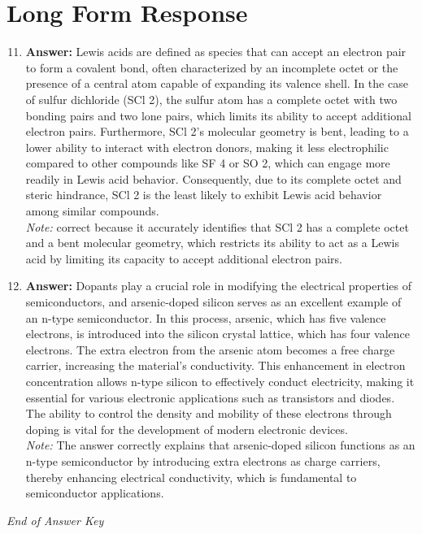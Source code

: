 \documentclass[12pt]{article}
\begin{document}
\section*{Long Form Response}
\begin{enumerate}[label=\arabic*.]
\setcounter{enumi}{10}
\item \textbf{Answer:} Lewis acids are defined as species that can accept an electron pair to form a covalent bond, often characterized by an incomplete octet or the presence of a central atom capable of expanding its valence shell. In the case of sulfur dichloride (SCl 2), the sulfur atom has a complete octet with two bonding pairs and two lone pairs, which limits its ability to accept additional electron pairs. Furthermore, SCl 2's molecular geometry is bent, leading to a lower ability to interact with electron donors, making it less electrophilic compared to other compounds like SF 4 or SO 2, which can engage more readily in Lewis acid behavior. Consequently, due to its complete octet and steric hindrance, SCl 2 is the least likely to exhibit Lewis acid behavior among similar compounds.
\\ \textit{Note:} correct because it accurately identifies that SCl 2 has a complete octet and a bent molecular geometry, which restricts its ability to act as a Lewis acid by limiting its capacity to accept additional electron pairs.
\item \textbf{Answer:} Dopants play a crucial role in modifying the electrical properties of semiconductors, and arsenic-doped silicon serves as an excellent example of an n-type semiconductor. In this process, arsenic, which has five valence electrons, is introduced into the silicon crystal lattice, which has four valence electrons. The extra electron from the arsenic atom becomes a free charge carrier, increasing the material's conductivity. This enhancement in electron concentration allows n-type silicon to effectively conduct electricity, making it essential for various electronic applications such as transistors and diodes. The ability to control the density and mobility of these electrons through doping is vital for the development of modern electronic devices.
\\ \textit{Note:} The answer correctly explains that arsenic-doped silicon functions as an n-type semiconductor by introducing extra electrons as charge carriers, thereby enhancing electrical conductivity, which is fundamental to semiconductor applications.
\end{enumerate}

\vfill
\noindent\textit{End of Answer Key}
\end{document}
